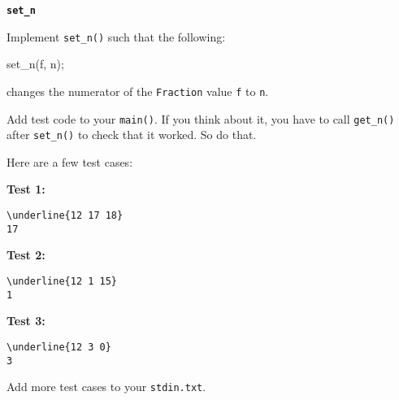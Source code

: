 \textbf{\texttt{set\_n}}

Implement \verb!set_n()! such that the following:
\begin{console}
set_n(f, n);
\end{console}
changes the numerator of the \verb!Fraction! value \verb!f! to \verb!n!.

Add test code to your \verb!main()!. If you think about it, you have to call
\verb!get_n()! after \verb!set_n()! to check that it worked. So do that.

Here are a few test cases:

\textbf{Test 1:}
\begin{Verbatim}[frame=single, commandchars=\\\{\}]
\underline{12 17 18}
17
\end{Verbatim}

\textbf{Test 2:}
\begin{Verbatim}[frame=single, commandchars=\\\{\}]
\underline{12 1 15}
1
\end{Verbatim}

\textbf{Test 3:}
\begin{Verbatim}[frame=single, commandchars=\\\{\}]
\underline{12 3 0}
3
\end{Verbatim}

Add more test cases to your \verb!stdin.txt!.
